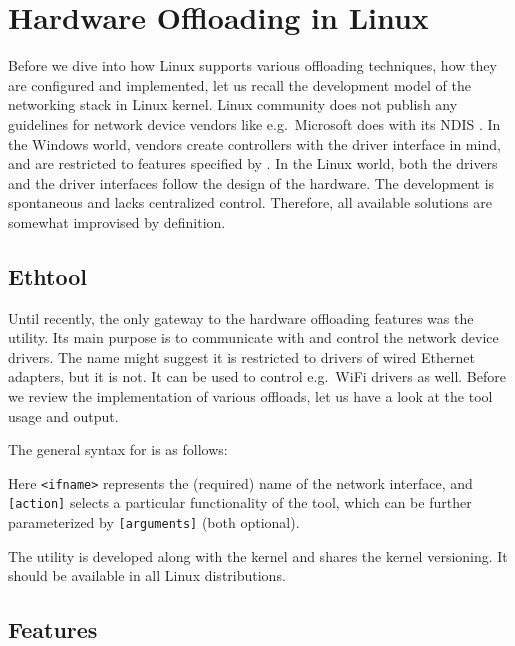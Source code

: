 \chapter{Hardware Offloading in Linux}

Before we dive into how Linux supports various offloading techniques, how they
are configured and implemented, let us recall the development
model of the networking stack in Linux kernel. Linux
community does not publish any guidelines for network device vendors like
e.g.\ Microsoft does with its \acrfull{NDIS} \cite{NDIS}. In the Windows world,
vendors create controllers with the driver interface in mind, and are
restricted to features specified by . In the Linux world, both the
drivers and the driver interfaces follow the design of the hardware. The
development is spontaneous and lacks centralized control. Therefore, all available
solutions are somewhat improvised by definition.

\section{Ethtool}

Until recently, the only gateway to the hardware offloading features was the
 utility. Its main purpose is to communicate with and
control the network device drivers. The name might suggest it is restricted to
drivers of wired Ethernet adapters, but it is not. It can be used to control e.g.\ WiFi
drivers as well. Before we review the implementation of various offloads, let
us have a look at the tool usage and output.

The general syntax for  is as follows:


Here \texttt{<ifname>} represents the (required) name of the network
interface, and \texttt{[action]} selects a particular functionality of the
tool, which can be further parameterized by \texttt{[arguments]} (both
optional).

The utility is developed along with the kernel and shares the kernel
versioning. It should be available in all Linux distributions.

\section{Features}

